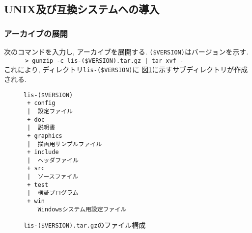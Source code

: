 \documentclass[a4paper]{jarticle}
\begin{document}
\subsection{UNIX及び互換システムへの導入}
\subsubsection{アーカイブの展開}
次のコマンドを入力し, アーカイブを展開する. \verb|($VERSION)|はバージョンを示す. \\
\verb&      > gunzip -c lis-($VERSION).tar.gz | tar xvf - &\\
これにより, ディレクトリ{\tt lis-(\$VERSION)}に
図\ref{listargz}に示すサブディレクトリが作成される. 

\begin{figure}[htbp]
\begin{center}
\begin{verbatim}
lis-($VERSION)
 + config
 |  設定ファイル
 + doc
 |  説明書
 + graphics
 |  描画用サンプルファイル
 + include
 |  ヘッダファイル
 + src
 |  ソースファイル
 + test
 |  検証プログラム
 + win
    Windowsシステム用設定ファイル
\end{verbatim}
\end{center}
\caption{{\tt lis-(\$VERSION).tar.gz}のファイル構成}
\label{listargz}
\end{figure}
\end{document}
